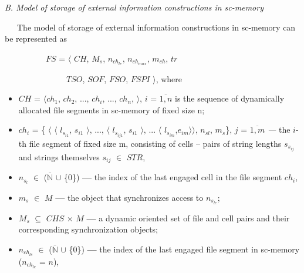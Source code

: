 \documentclass[10pt, a4paper, twocolumn]{article}
\begin{document}
\textit{B. Model of storage of external information constructions in sc-memory}
\par \ \ \ The model of storage of external information constructions in sc-memory can be represented as
\par \ \ \ \ \ \ \ \ \ \ $FS$ = $\langle$ $CH$, $M_{s}$, $n_{ch_{le}}$, $n_{ch_{max}}$, $m_{ch}$, $tr$ \\
\par \ \ \ \ \ \ \ \ \ \ \ \ \ \ \ $TSO$, $SOF$, $FSO$, $FSPI$ $\rangle$,
where
\begin{itemize}[noitemsep,topsep=0pt,parsep=0pt,partopsep=0pt]
    \item $CH$ = $\langle$$ch_{1}$, $ch_{2}$, ..., $ch_{i}$, ..., $ch_{n}$,   $\rangle$, $i$ = $\overline{1, n}$ is
the sequence of dynamically allocated file segments
in sc-memory of fixed size n;
    \item $ch_{i}$ = \{ $\langle$ $\langle$ $l_{s_{i1}}$, $s_{i1}$  $\rangle$, ..., $\langle$ $l_{s_{ij1}}$, $s_{i1}$  $\rangle$, ... $\langle$ $l_{s_{im}}$,$e_{im}$$\rangle$$\rangle$, $n_{sl}$, $m_{s}$\}, $j$ = $\overline{1, m}$ \textit{---} the $i$-th file segment of fixed size m, consisting of cells – pairs of string lengths $s_{s_{ij}}$ and strings themselves $s_{ij}$ $\in$ $STR$,
    \item $n_{s_{l}}$ $\in$ ($\mathbb{\bar N}$ $\cup$ \{0\}) \textbf{---}  the index of the last engaged
cell in the file segment $ch_{i}$,
    \item $m_{s}$ $\in$ $M$ \textbf{---} the object that synchronizes access to $n_{s_{le}}$;
    \item $M_{s}$ $\subseteq$ $CHS$ $\times$ $M$ \textbf{---} a dynamic oriented set of file
and cell pairs and their corresponding synchronization objects;
    \item $n_{ch_{le}}$ $\in$  ($\mathbb{\bar N}$ $\cup$ \{0\}) \textbf{---} the index of the last engaged
file segment in sc-memory ($n_{ch_{le}}$ = $n$),
\end{itemize}
\end{document}
